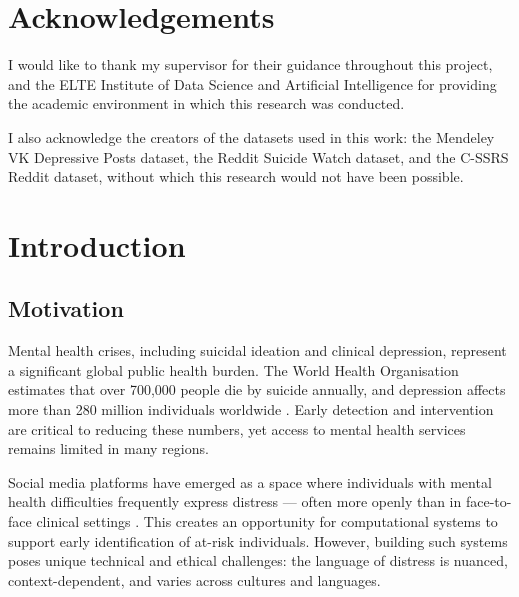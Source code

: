 \documentclass[12pt, a4paper, oneside]{report}
\begin{document}
\clearpage

\chapter*{Acknowledgements}

I would like to thank my supervisor for their guidance throughout this project, and the ELTE Institute of Data Science and Artificial Intelligence for providing the academic environment in which this research was conducted.

I also acknowledge the creators of the datasets used in this work: the Mendeley VK Depressive Posts dataset, the Reddit Suicide Watch dataset, and the C-SSRS Reddit dataset, without which this research would not have been possible.

\clearpage

\tableofcontents
\listoffigures
\listoftables

\clearpage

\chapter{Introduction}
\label{ch:intro}

\section{Motivation}

Mental health crises, including suicidal ideation and clinical depression, represent a significant global public health burden. The World Health Organisation estimates that over 700,000 people die by suicide annually, and depression affects more than 280 million individuals worldwide \citep{who2023}. Early detection and intervention are critical to reducing these numbers, yet access to mental health services remains limited in many regions.

Social media platforms have emerged as a space where individuals with mental health difficulties frequently express distress — often more openly than in face-to-face clinical settings \citep{de2014mental}. This creates an opportunity for computational systems to support early identification of at-risk individuals. However, building such systems poses unique technical and ethical challenges: the language of distress is nuanced, context-dependent, and varies across cultures and languages.
\end{document}
